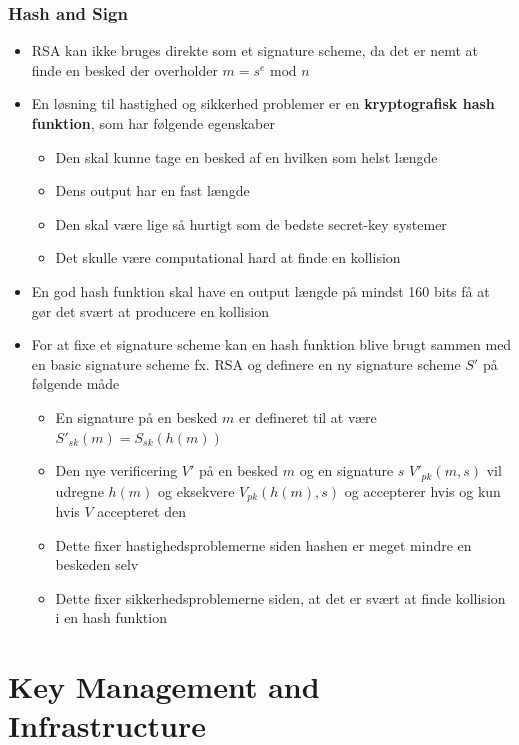 \documentclass[a4, english]{article}
\begin{document}
\subsubsection{Hash and Sign}
\begin{itemize}
	\item RSA kan ikke bruges direkte som et signature scheme, da det er nemt at finde en besked der overholder $m = s^e \text{ mod } n$
  \item En løsning til hastighed og sikkerhed problemer er en \textbf{kryptografisk hash funktion}, som har følgende egenskaber  
  \begin{itemize}
  	\item Den skal kunne tage en besked af en hvilken som helst længde
    \item Dens output har en fast længde 
    \item Den skal være lige så hurtigt som de bedste secret-key systemer
    \item Det skulle være computational hard at finde en kollision 
  \end{itemize}
  \item En god hash funktion skal have en output længde på mindst 160 bits få at gør det svært at producere en kollision 
  \item For at fixe et signature scheme kan en hash funktion blive brugt sammen med en basic signature scheme fx. RSA og definere en ny signature scheme $S'$ på følgende måde 
  \begin{itemize}
  	\item En signature på en besked $m$ er defineret til at være $S'_{sk}(m) = S_{sk}(h(m))$
    \item Den nye verificering $V'$ på en besked $m$ og en signature $s$  $V'_{pk}(m,s)$ vil udregne $h(m)$ og eksekvere $V_{pk}(h(m),s)$ og accepterer hvis og kun hvis $V$ accepteret den 
    \item Dette fixer hastighedsproblemerne siden hashen er meget mindre en beskeden selv 
    \item Dette fixer sikkerhedsproblemerne siden, at det er svært at finde kollision i en hash funktion
  \end{itemize}
\end{itemize}

\newpage

\section{Key Management and Infrastructure}
\end{document}
